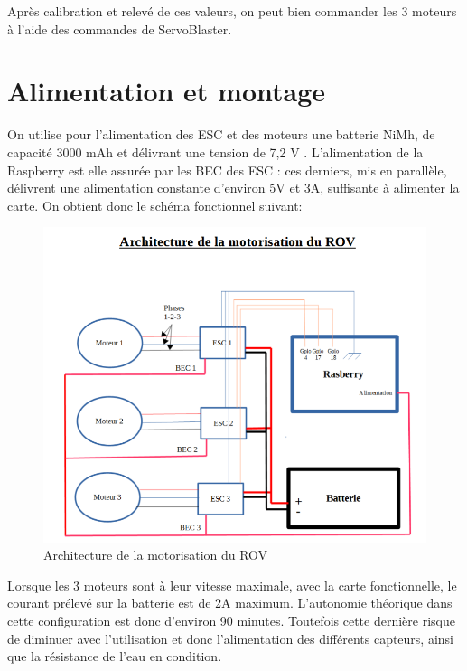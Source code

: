\documentclass[a4paper,11pt]{report}
\begin{document}
				Après calibration et relevé de ces valeurs, on peut bien commander les 3 moteurs à l'aide des commandes de ServoBlaster. \newpage
				
				\section{Alimentation et montage}
				
				On utilise pour l'alimentation des ESC et des moteurs une batterie NiMh, de capacité 3000 mAh et délivrant une tension de 7,2 V \cite{ref10}. L'alimentation de la Raspberry est elle assurée par les BEC des ESC : ces derniers, mis en parallèle, délivrent une alimentation constante d'environ 5V et 3A, suffisante à alimenter la carte. On obtient donc le schéma fonctionnel suivant:
				\begin{figure}[!h]
				  \begin{center}
				  	\includegraphics[scale=0.7]{Photos/archi_rov}
						\caption{Architecture de la motorisation du ROV}
				  \end{center}
		  	\end{figure}
				
				
				Lorsque les 3 moteurs sont à leur vitesse maximale, avec la carte fonctionnelle, le courant prélevé sur la batterie est de 2A maximum. L'autonomie théorique dans cette configuration est donc d'environ 90 minutes. Toutefois cette dernière risque de diminuer avec l'utilisation et donc l'alimentation des différents capteurs, ainsi que la résistance de l'eau en condition.
				
\end{document}

